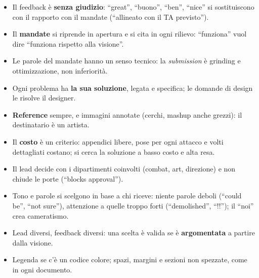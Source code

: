\begin{itemize}
  \item Il feedback è \textbf{senza giudizio}: ``great'', ``buono'',
        ``ben'', ``nice'' si sostituiscono con il rapporto con il mandate
        (``allineato con il TA previsto'').
  \item Il \textbf{mandate} si riprende in apertura e si cita in ogni
        rilievo: ``funziona'' vuol dire ``funziona rispetto alla visione''.
  \item Le parole del mandate hanno un senso tecnico: la
        \emph{submission} è grinding e ottimizzazione, non inferiorità.
  \item Ogni problema ha \textbf{la sua soluzione}, legata e specifica; le
        domande di design le risolve il designer.
  \item \textbf{Reference} sempre, e immagini annotate (cerchi, mashup anche
        grezzi): il destinatario è un artista.
  \item Il \textbf{costo} è un criterio: appendici libere, pose per ogni
        attacco e volti dettagliati costano; si cerca la soluzione a basso
        costo e alta resa.
  \item Il lead decide con i dipartimenti coinvolti (combat, art,
        direzione) e non chiude le porte (``blocks approval'').
  \item Tono e parole si scelgono in base a chi riceve: niente parole
        deboli (``could be'', ``not sure''), attenzione a quelle troppo forti
        (``demolished'', ``!!''); il ``noi'' crea cameratismo.
  \item Lead diversi, feedback diversi: una scelta è valida se è
        \textbf{argomentata} a partire dalla visione.
  \item Legenda se c'è un codice colore; spazi, margini e sezioni non
        spezzate, come in ogni documento.
\end{itemize}

